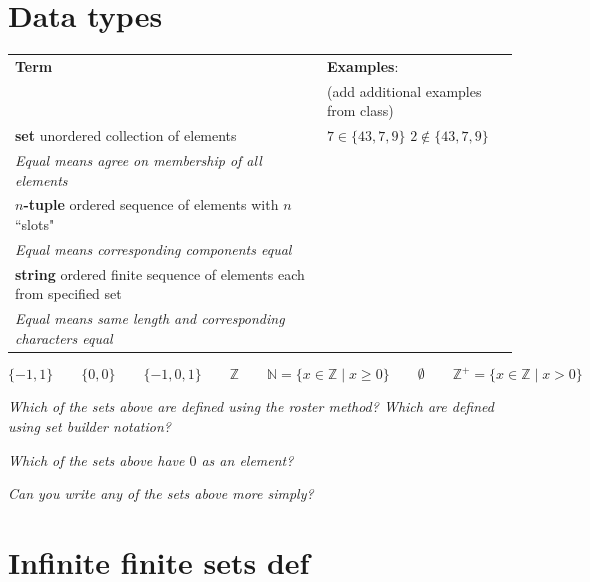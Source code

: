 \documentclass[12pt, oneside]{article}
\begin{document}
\vfill
 \vfill
\section*{Data types}


\begin{center}
    \begin{tabular}{p{4.4in}p{2.8in}}
    {\bf  Term} & {\bf Examples}:\\
    &  (add additional examples from class)\\
    \hline 
    {\bf set} \newline
    unordered collection of elements & $7 \in \{43, 7, 9 \}$ \qquad $2 \notin \{43, 7, 9 \}$ \\
    {\it Equal means agree on membership of all elements}& \\
    \hline
    {\bf $n$-tuple} \newline
    ordered sequence of elements with $n$ ``slots" & \\
    {\it Equal means corresponding components equal}& \\
    \hline
    {\bf string} \newline
    ordered finite sequence of elements each from specified
    set & \\
    {\it Equal means same length and corresponding characters equal}
    \end{tabular}
    \end{center}
    \[
    \{ -1, 1\} \qquad 
    \{0, 0 \} \qquad
    \{-1, 0, 1 \} \qquad
    \mathbb{Z} \qquad
    \mathbb{N} = \{ x \in \mathbb{Z} \mid x \geq 0 \} \qquad
    \emptyset \qquad
    \mathbb{Z}^+ = \{ x \in \mathbb{Z}  \mid x > 0 \}
    \]
    
    \vfill
    
    {\it Which of the sets above are defined using the roster method? Which are defined using set builder notation?}
    
    {\it Which of the sets above have $0$ as an element?}
    
    {\it Can you write any of the sets above more simply?}
    
    \vfill \vfill
\section*{Infinite finite sets def}
\end{document}
